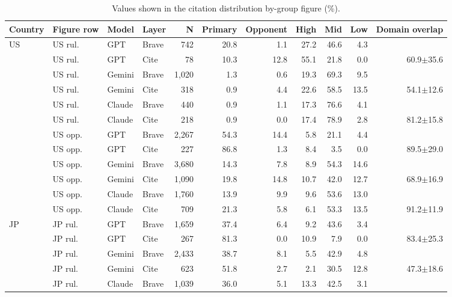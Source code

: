 \begin{table}[t]
\centering
\footnotesize
\setlength{\tabcolsep}{2pt}
\caption{Values shown in the citation distribution by-group figure (\%).}
\label{tab:citation-by-group-values}
\begin{tabular}{llllrrrrrrr}
\toprule
\textbf{Country} & \textbf{Figure row} & \textbf{Model} & \textbf{Layer} & \textbf{N} & \textbf{Primary} & \textbf{Opponent} & \textbf{High} & \textbf{Mid} & \textbf{Low} & \textbf{Domain overlap} \\
\midrule
US & US rul. & GPT & Brave & 742 & 20.8 & 1.1 & 27.2 & 46.6 & 4.3 &  \\
 & US rul. & GPT & Cite & 78 & 10.3 & 12.8 & 55.1 & 21.8 & 0.0 & 60.9$\pm$35.6 \\
 & US rul. & Gemini & Brave & 1{,}020 & 1.3 & 0.6 & 19.3 & 69.3 & 9.5 &  \\
 & US rul. & Gemini & Cite & 318 & 0.9 & 4.4 & 22.6 & 58.5 & 13.5 & 54.1$\pm$12.6 \\
 & US rul. & Claude & Brave & 440 & 0.9 & 1.1 & 17.3 & 76.6 & 4.1 &  \\
 & US rul. & Claude & Cite & 218 & 0.9 & 0.0 & 17.4 & 78.9 & 2.8 & 81.2$\pm$15.8 \\
\cmidrule(lr){2-11}
 & US opp. & GPT & Brave & 2{,}267 & 54.3 & 14.4 & 5.8 & 21.1 & 4.4 &  \\
 & US opp. & GPT & Cite & 227 & 86.8 & 1.3 & 8.4 & 3.5 & 0.0 & 89.5$\pm$29.0 \\
 & US opp. & Gemini & Brave & 3{,}680 & 14.3 & 7.8 & 8.9 & 54.3 & 14.6 &  \\
 & US opp. & Gemini & Cite & 1{,}090 & 19.8 & 14.8 & 10.7 & 42.0 & 12.7 & 68.9$\pm$16.9 \\
 & US opp. & Claude & Brave & 1{,}760 & 13.9 & 9.9 & 9.6 & 53.6 & 13.0 &  \\
 & US opp. & Claude & Cite & 709 & 21.3 & 5.8 & 6.1 & 53.3 & 13.5 & 91.2$\pm$11.9 \\
\cmidrule(lr){1-11}
JP & JP rul. & GPT & Brave & 1{,}659 & 37.4 & 6.4 & 9.2 & 43.6 & 3.4 &  \\
 & JP rul. & GPT & Cite & 267 & 81.3 & 0.0 & 10.9 & 7.9 & 0.0 & 83.4$\pm$25.3 \\
 & JP rul. & Gemini & Brave & 2{,}433 & 38.7 & 8.1 & 5.5 & 42.9 & 4.8 &  \\
 & JP rul. & Gemini & Cite & 623 & 51.8 & 2.7 & 2.1 & 30.5 & 12.8 & 47.3$\pm$18.6 \\
 & JP rul. & Claude & Brave & 1{,}039 & 36.0 & 5.1 & 13.3 & 42.5 & 3.1 &  \\

\end{tabular}
\end{table}
